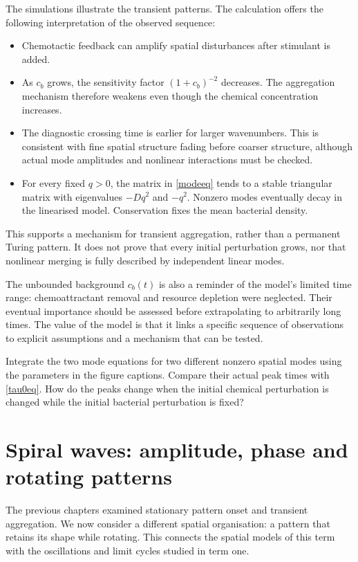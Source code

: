 \documentclass[main.tex]{subfiles}
\begin{document}
The simulations illustrate the transient patterns. The calculation offers the following interpretation of the observed sequence:
\begin{itemize}
\item Chemotactic feedback can amplify spatial disturbances after stimulant is added.
\item As $c_b$ grows, the sensitivity factor $(1+c_b)^{-2}$ decreases. The aggregation mechanism therefore weakens even though the chemical concentration increases.
\item The diagnostic crossing time is earlier for larger wavenumbers. This is consistent with fine spatial structure fading before coarser structure, although actual mode amplitudes and nonlinear interactions must be checked.
\item For every fixed $q>0$, the matrix in \cref{modeeq} tends to a stable triangular matrix with eigenvalues $-Dq^2$ and $-q^2$. Nonzero modes eventually decay in the linearised model. Conservation fixes the mean bacterial density.
\end{itemize}
This supports a mechanism for transient aggregation, rather than a permanent Turing pattern. It does not prove that every initial perturbation grows, nor that nonlinear merging is fully described by independent linear modes.

The unbounded background $c_b(t)$ is also a reminder of the model's limited time range: chemoattractant removal and resource depletion were neglected. Their eventual importance should be assessed before extrapolating to arbitrarily long times. The value of the model is that it links a specific sequence of observations to explicit assumptions and a mechanism that can be tested.

\begin{do-it-yourself}
Integrate the two mode equations for two different nonzero spatial modes using the parameters in the figure captions. Compare their actual peak times with \cref{tau0eq}. How do the peaks change when the initial chemical perturbation is changed while the initial bacterial perturbation is fixed?
\end{do-it-yourself}

\chapter{Spiral waves: amplitude, phase and rotating patterns}\label{spiral:chapter}
The previous chapters examined stationary pattern onset and transient aggregation. We now consider a different spatial organisation: a pattern that retains its shape while rotating. This connects the spatial models of this term with the oscillations and limit cycles studied in term one.
\end{document}
